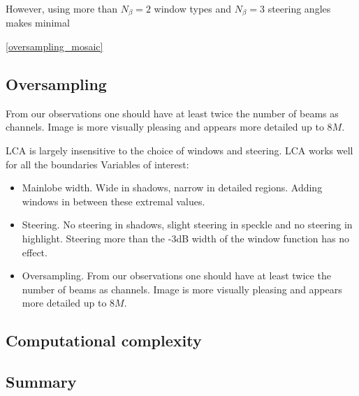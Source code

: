 \documentclass[10pt,journal,draftclsnofoot,onecolumn]{IEEEtran}
\newcommand\1{\vec 1}
\begin{document}
However, using more than  $N_\beta=2$ window types and $N_\beta=3$ steering angles makes minimal

\ref{oversampling_mosaic}

\subsection{Oversampling}

From our observations one should have at least twice the number of beams as channels. Image is more visually pleasing and appears more detailed up to $8M$.


LCA is largely insensitive to the choice of windows and steering. 
LCA works well for all the boundaries
Variables of interest:

\begin{itemize}
\item Mainlobe width. Wide in shadows, narrow in detailed regions. Adding windows in between these extremal values.
\item Steering. No steering in shadows, slight steering in speckle and no steering in highlight. Steering more than the -3dB width of the window function has no effect.
\item Oversampling. From our observations one should have at least twice the number of beams as channels. Image is more visually pleasing and appears more detailed up to $8M$.
\end{itemize}

\subsection{Computational complexity}





\subsection{Summary}
\end{document}
